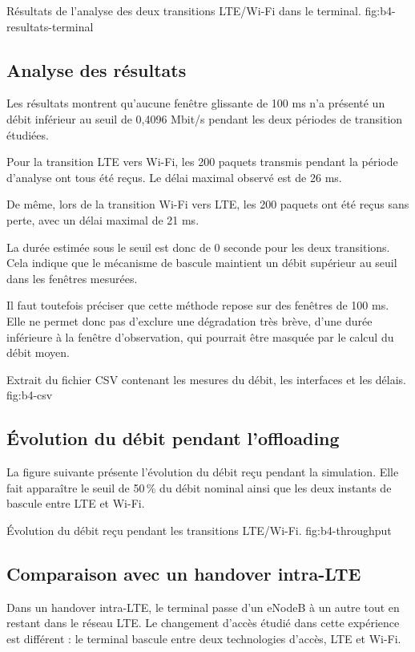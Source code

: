 {Résultats de l'analyse des deux transitions LTE/Wi-Fi dans le terminal.}
{fig:b4-resultats-terminal}

\subsection{Analyse des résultats}

Les résultats montrent qu'aucune fenêtre glissante de 100 ms
n'a présenté un débit inférieur au seuil de 0,4096 Mbit/s
pendant les deux périodes de transition étudiées.

Pour la transition LTE vers Wi-Fi, les 200 paquets transmis
pendant la période d'analyse ont tous été reçus. Le délai maximal
observé est de 26 ms.

De même, lors de la transition Wi-Fi vers LTE, les 200 paquets
ont été reçus sans perte, avec un délai maximal de 21 ms.

La durée estimée sous le seuil est donc de 0 seconde pour les
deux transitions. Cela indique que le mécanisme de bascule
maintient un débit supérieur au seuil dans les fenêtres mesurées.

Il faut toutefois préciser que cette méthode repose sur des
fenêtres de 100 ms. Elle ne permet donc pas d'exclure une
dégradation très brève, d'une durée inférieure à la fenêtre
d'observation, qui pourrait être masquée par le calcul du débit
moyen.

{Extrait du fichier CSV contenant les mesures du débit, les interfaces et les délais.}
{fig:b4-csv}

\subsection{Évolution du débit pendant l'offloading}

La figure suivante présente l'évolution du débit reçu pendant
la simulation. Elle fait apparaître le seuil de 50\,\% du débit
nominal ainsi que les deux instants de bascule entre LTE et Wi-Fi.

{Évolution du débit reçu pendant les transitions LTE/Wi-Fi.}
{fig:b4-throughput}

\subsection{Comparaison avec un handover intra-LTE}

Dans un handover intra-LTE, le terminal passe d'un eNodeB à
un autre tout en restant dans le réseau LTE. Le changement
d'accès étudié dans cette expérience est différent : le terminal
bascule entre deux technologies d'accès, LTE et Wi-Fi.

